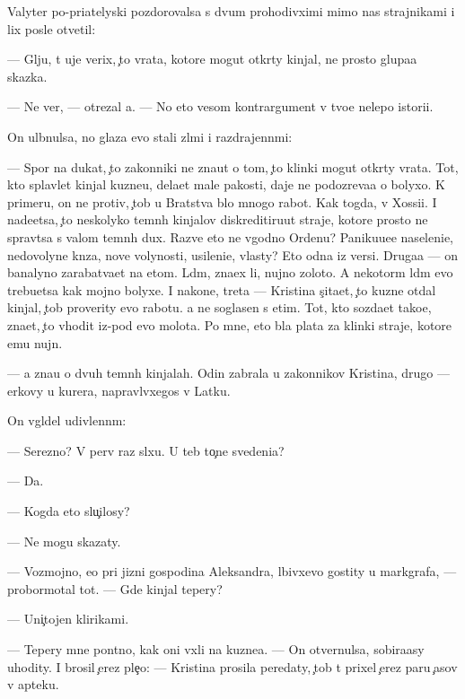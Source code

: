 \documentclass[10pt]{book}
\begin{document}
Valyter po-pri{\y}atelyski pozdorovalsa s dvum{\ia} prohodivximi mimo nas strajnikami i lix posle otvetil:

— Gl{\ia}ju, t{\yi} uje verix, {\c}to vrata, kotor{\yi}{\y}e mogut otkr{\yi}ty kinjal{\yi}, ne prosto glupa{\y}a skazka.

— Ne ver{\iu}, — otrezal {\y}a. — No eto vesom{\yi}{\y} kontrargument v tvo{\y}e{\y} nelepo{\y} istori{\y}i.

On ul{\yi}bnulsa, no glaza {\y}evo stali zl{\yi}mi i razdrajenn{\yi}mi:

— Spor{\iu} na dukat, {\c}to zakonniki ne zna{\y}ut o tom, {\c}to klinki mogut otkr{\yi}ty vrata. Tot, kto splavl{\ia}{\y}et kinjal{\yi} kuzne{\q}u, dela{\y}et mal{\yi}{\y}e pakosti, daje ne podozreva{\y}a o bolyxo{\y}. K primeru, on ne protiv, {\c}tob{\yi} u Bratstva b{\yi}lo mnogo rabot{\yi}. Kak togda, v Xossi{\y}i. I nade{\y}etsa, {\c}to neskolyko temn{\yi}h kinjalov diskreditiru{\y}ut straje{\y}, kotor{\yi}{\y}e prosto ne sprav{\ia}tsa s valom temn{\yi}h dux. Razve eto ne v{\yi}godno Ordenu? Paniku{\y}u{\x}e{\y}e naseleni{\y}e, nedovolyn{\yi}{\y}e kn{\ia}z{\y}a, nov{\yi}{\y}e volynosti, usileni{\y}e, vlasty? Eto odna iz versi{\y}. Druga{\y}a — on banalyno zarabat{\yi}va{\y}et na etom. L{\iu}d{\ia}m, zna{\y}ex li, nujno zoloto. A nekotor{\yi}m l{\iu}d{\ia}m {\y}evo trebu{\y}etsa kak mojno bolyxe. I nakone{\q}, tret{\y}a — Kristina s{\c}ita{\y}et, {\c}to kuzne{\q} otdal kinjal, {\c}tob{\yi} proverity {\y}evo rabotu. {\Y}a ne soglasen s etim. Tot, kto sozda{\y}et tako{\y}e, zna{\y}et, {\c}to v{\yi}hodit iz-pod {\y}evo molota. Po mne, eto b{\yi}la plata za klinki straje{\y}, kotor{\yi}{\y}e {\y}emu nujn{\yi}.

— {\Y}a zna{\y}u o dvuh temn{\yi}h kinjalah. Odin zabrala u zakonnikov Kristina, drugo{\y} — {\q}erkovy u kur{\y}era, napravl{\ia}vxegos{\ia} v Latku.

On v{\yi}gl{\ia}del udivlenn{\yi}m:

— Ser{\y}ezno? V perv{\yi}{\y} raz sl{\yi}xu. U teb{\ia} to{\c}n{\yi}{\y}e svedeni{\y}a?

— Da.

— Kogda eto slu{\c}ilosy?

— Ne mogu skazaty.

— Vozmojno, {\y}e{\x}o pri jizni gospodina Aleksandra, l{\iu}bivxevo gostity u markgrafa, — probormotal tot. — Gde kinjal tepery?

— Uni{\c}tojen klirikami.

— Tepery mne pon{\ia}tno, kak oni v{\yi}xli na kuzne{\q}a. — On otvernulsa, sobira{\y}asy uhodity. I brosil {\c}erez ple{\c}o: — Kristina prosila peredaty, {\c}tob{\yi} t{\yi} prixel {\c}erez paru {\c}asov v apteku.
\end{document}
